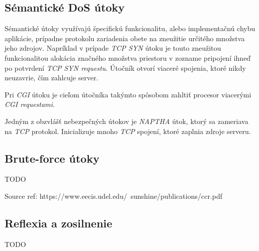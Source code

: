 \documentclass[
  printed, %
  table,   %
  lof,     %
  lot,     %
]{fithesis3}
\begin{document}
\subsection{Sémantické DoS útoky}
Sémantické útoky využívajú špecifickú funkcionalitu, alebo implementačnú chybu aplikácie,
prípadne protokolu zariadenia obete na zneužitie určitého množstva jeho zdrojov. Napríklad
v prípade \textit{TCP SYN} útoku je touto zneužitou funkcionalitou alokácia značného množstva
priestoru v zozname pripojení ihneď po potvrdení \textit{ TCP SYN requestu}. Útočník otvorí
viaceré spojenia, ktoré nikdy neuzavrie, čím zahlcuje server. 

Pri \textit{CGI} útoku je cieľom útočníka takýmto spôsobom zahltiť procesor viacerými
\textit{CGI requestami}.

Jedným z obzvlášť nebezpečných útokov je \textit{NAPTHA} útok, ktorý sa zameriava na
\textit{TCP} protokol. Inicializuje mnoho \textit{TCP} spojení, ktoré zaplnia zdroje serveru.

\subsection{Brute-force útoky}
TODO 

Source ref: https://www.eecis.udel.edu/~sunshine/publications/ccr.pdf

\subsection{Reflexia a zosilnenie}
TODO
\end{document}
